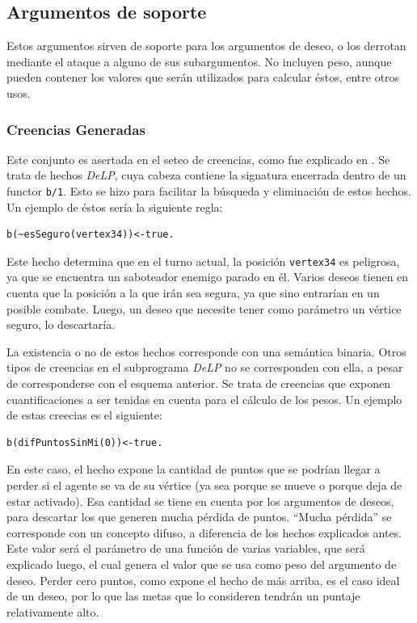 \documentclass[oneside]{book}
\theoremstyle{definition}
\theoremstyle{example}
\begin{document}
\subsection{Argumentos de soporte}

\label{sec:argumentosSoporte}

Estos argumentos sirven de soporte para los argumentos de deseo, o los derrotan mediante
el ataque a alguno de sus subargumentos. 
No incluyen peso, aunque pueden contener los valores que serán utilizados para calcular 
éstos, entre otros usos.


\subsubsection{Creencias Generadas}

Este conjunto es asertada en el seteo de creencias, como fue explicado en %
. Se trata de hechos \textit{DeLP}, cuya cabeza contiene la signatura encerrada dentro
de un functor \texttt{b/1}. Esto se hizo para facilitar la búsqueda y eliminación de
estos hechos. Un ejemplo de éstos sería la siguiente regla:

\begin{verbatim}
b(~esSeguro(vertex34))<-true.
\end{verbatim}

Este hecho determina que en el turno actual, la posición \texttt{vertex34} es peligrosa,
ya que se encuentra un saboteador enemigo parado en él. Varios deseos tienen en cuenta
que la posición a la que irán sea segura, ya que sino entrarían en un posible combate.
Luego, un deseo que necesite tener como parámetro un vértice seguro, lo descartaría.

La existencia o no de estos hechos corresponde con una semántica binaria. Otros tipos de
creencias en el subprograma \textit{DeLP} no se corresponden con ella, a pesar de corresponderse
con el esquema anterior. Se trata de creencias que exponen cuantificaciones a ser 
tenidas en cuenta para el cálculo de los pesos. Un ejemplo de estas creecias es el 
siguiente:

\begin{verbatim}
b(difPuntosSinMi(0))<-true.
\end{verbatim}

En este caso, el hecho expone la cantidad de puntos que se podrían llegar a perder si el
agente se va de su vértice (ya sea porque se mueve o porque deja de estar activado). Esa
cantidad se tiene en cuenta por los argumentos de deseos, para descartar los que generen
mucha pérdida de puntos. ``Mucha pérdida'' se corresponde con un concepto difuso, a
diferencia de los hechos explicados antes. Este valor será el parámetro de una función
de varias variables, que será explicado luego, el cual genera el valor que se usa como
peso del argumento de deseo. Perder cero puntos, como expone el hecho de más arriba, es el
caso ideal de un deseo, por lo que las metas que lo consideren tendrán un puntaje
relativamente alto.
\end{document}
